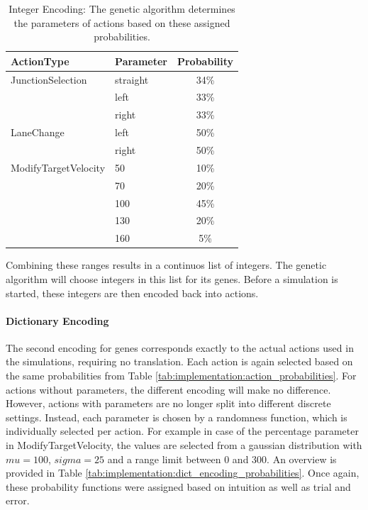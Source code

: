 \begin{table}[ht]
	\centering
	\begin{tabular}{llc}
		\hline
		ActionType & Parameter & Probability \\
		\hline
		JunctionSelection 	& straight & 34\% \\
		& left & 33\% \\
		& right & 33\% \\
		\hline
		LaneChange 			& left & 50\% \\
		& right & 50\% \\
		\hline
		ModifyTargetVelocity & 50 & 10\%\\
		& 70 & 20\%\\
		& 100 & 45\%\\
		& 130 & 20\%\\
		& 160 & 5\%\\
		\hline
	\end{tabular}
	\caption{Integer Encoding: The genetic algorithm determines the parameters of actions based on these assigned probabilities.}
	\label{tab:implementation:integer_encoding_probabilities}
\end{table}

Combining these ranges results in a continuos list of integers. The genetic algorithm will choose integers in this list for its genes. Before a simulation is started, these integers are then encoded back into actions.

\paragraph{Dictionary Encoding}
The second encoding for genes corresponds exactly to the actual actions used in the simulations, requiring no translation. Each action is again selected based on the same probabilities from Table \ref{tab:implementation:action_probabilities}. For actions without parameters, the different encoding will make no difference. However, actions with parameters are no longer split into different discrete settings. Instead, each parameter is chosen by a randomness function, which is individually selected per action. For example in case of the percentage parameter in ModifyTargetVelocity, the values are selected from a gaussian distribution with $mu=100$, $sigma=25$ and a range limit between 0 and 300. An overview is provided in Table \ref{tab:implementation:dict_encoding_probabilities}.
Once again, these probability functions were assigned based on intuition as well as trial and error. 

